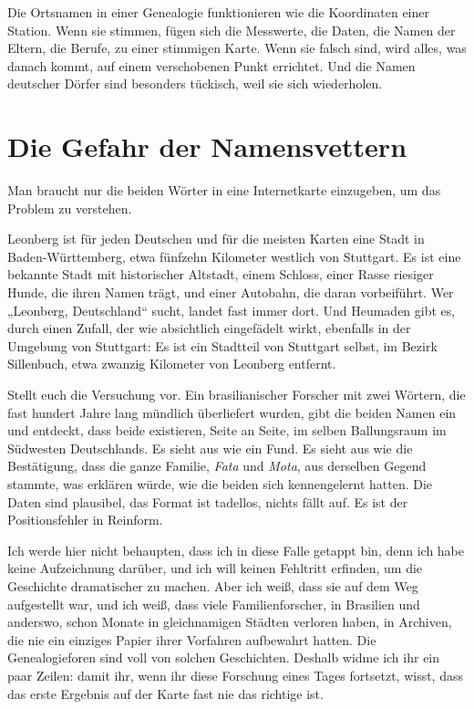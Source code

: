 \documentclass[
  ngerman,
  11pt,
  openany]{book}
\begin{document}
Die Ortsnamen in einer Genealogie funktionieren wie die Koordinaten
einer Station. Wenn sie stimmen, fügen sich die Messwerte, die Daten,
die Namen der Eltern, die Berufe, zu einer stimmigen Karte. Wenn sie
falsch sind, wird alles, was danach kommt, auf einem verschobenen Punkt
errichtet. Und die Namen deutscher Dörfer sind besonders tückisch, weil
sie sich wiederholen.

\section{Die Gefahr der
Namensvettern}\label{die-gefahr-der-namensvettern}

Man braucht nur die beiden Wörter in eine Internetkarte einzugeben, um
das Problem zu verstehen.

Leonberg ist für jeden Deutschen und für die meisten Karten eine Stadt
in Baden-Württemberg, etwa fünfzehn Kilometer westlich von Stuttgart. Es
ist eine bekannte Stadt mit historischer Altstadt, einem Schloss, einer
Rasse riesiger Hunde, die ihren Namen trägt, und einer Autobahn, die
daran vorbeiführt. Wer „Leonberg, Deutschland`` sucht, landet fast immer
dort. Und Heumaden gibt es, durch einen Zufall, der wie absichtlich
eingefädelt wirkt, ebenfalls in der Umgebung von Stuttgart: Es ist ein
Stadtteil von Stuttgart selbst, im Bezirk Sillenbuch, etwa zwanzig
Kilometer von Leonberg entfernt.

Stellt euch die Versuchung vor. Ein brasilianischer Forscher mit zwei
Wörtern, die fast hundert Jahre lang mündlich überliefert wurden, gibt
die beiden Namen ein und entdeckt, dass beide existieren, Seite an
Seite, im selben Ballungsraum im Südwesten Deutschlands. Es sieht aus
wie ein Fund. Es sieht aus wie die Bestätigung, dass die ganze Familie,
\emph{Fata} und \emph{Mota}, aus derselben Gegend stammte, was erklären
würde, wie die beiden sich kennengelernt hatten. Die Daten sind
plausibel, das Format ist tadellos, nichts fällt auf. Es ist der
Positionsfehler in Reinform.

Ich werde hier nicht behaupten, dass ich in diese Falle getappt bin,
denn ich habe keine Aufzeichnung darüber, und ich will keinen Fehltritt
erfinden, um die Geschichte dramatischer zu machen. Aber ich weiß, dass
sie auf dem Weg aufgestellt war, und ich weiß, dass viele
Familienforscher, in Brasilien und anderswo, schon Monate in
gleichnamigen Städten verloren haben, in Archiven, die nie ein einziges
Papier ihrer Vorfahren aufbewahrt hatten. Die Genealogieforen sind voll
von solchen Geschichten. Deshalb widme ich ihr ein paar Zeilen: damit
ihr, wenn ihr diese Forschung eines Tages fortsetzt, wisst, dass das
erste Ergebnis auf der Karte fast nie das richtige ist.
\end{document}
